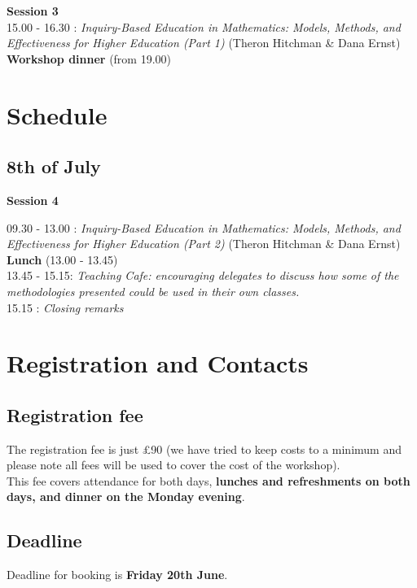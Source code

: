 \documentclass {leaflet}
\begin{document}
\textbf{Session 3}\\

15.00 - 16.30 : \textit{Inquiry-Based Education in Mathematics: Models, Methods, and Effectiveness for Higher Education (Part 1)} (Theron Hitchman \& Dana Ernst)\\

\textbf{Workshop dinner} (from 19.00)

\newpage
\section{Schedule}
\subsection{8th of July}
\vspace{1cm}

\textbf{Session 4}
\vspace{1cm}

09.30 - 13.00 : \textit{Inquiry-Based Education in Mathematics: Models, Methods, and Effectiveness for Higher Education (Part 2)} (Theron Hitchman \& Dana Ernst)\\

\textbf{Lunch} (13.00 - 13.45)\\

13.45 - 15.15: \textit{Teaching Cafe: encouraging delegates to discuss how some of the methodologies presented could be used in their own classes.}\\

15.15 : \textit{Closing remarks}

\newpage
\section{Registration and Contacts}
\subsection{Registration fee}

The registration fee is just \pounds90 (we have tried to keep costs to a minimum and please note all fees will be used to cover the cost of the workshop). \\

This fee covers attendance for both days, \textbf{lunches and refreshments on both days, and dinner on the Monday evening}.\\


\subsection{Deadline}
Deadline for booking is \textbf{Friday 20th June}.\\
\end{document}
